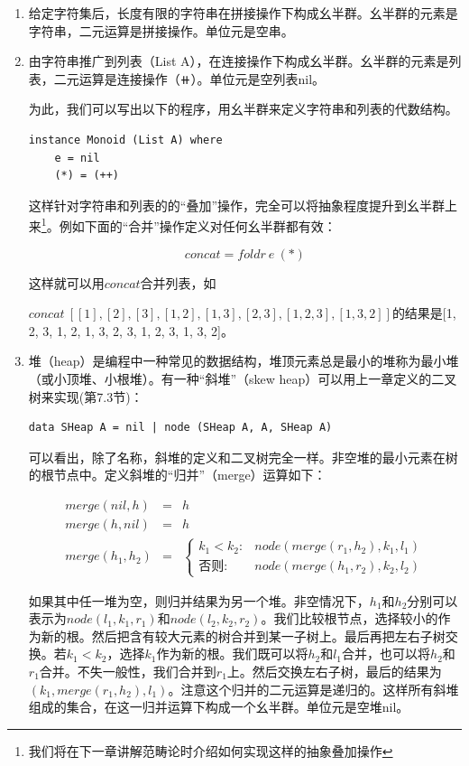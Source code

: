 \documentclass{article}
\begin{document}
\begin{enumerate}
\item 给定字符集后，长度有限的字符串在拼接操作下构成幺半群。幺半群的元素是字符串，二元运算是拼接操作。单位元是空串。
\item 由字符串推广到列表（List A），在连接操作下构成幺半群。幺半群的元素是列表，二元运算是连接操作（$\doubleplus$）。单位元是空列表nil。

为此，我们可以写出以下的程序，用幺半群来定义字符串和列表的代数结构。

\begin{lstlisting}
instance Monoid (List A) where
    e = nil
    (*) = (++)
\end{lstlisting}

这样针对字符串和列表的的“叠加”操作，完全可以将抽象程度提升到幺半群上来\footnote{我们将在下一章讲解范畴论时介绍如何实现这样的抽象叠加操作}。例如下面的“合并”操作定义对任何幺半群都有效：

\[
concat = foldr\ e\ (*)
\]

这样就可以用$concat$合并列表，如

$concat\ [[1], [2], [3], [1, 2], [1, 3], [2, 3], [1, 2, 3], [1, 3, 2]]$的结果是[1, 2, 3, 1, 2, 1, 3, 2, 3, 1, 2, 3, 1, 3, 2]。

\item 堆（heap）是编程中一种常见的数据结构，堆顶元素总是最小的堆称为最小堆（或小顶堆、小根堆）。有一种“斜堆”（skew heap）可以用上一章定义的二叉树来实现(\cite{LiuXinyu2017}第7.3节)：

\begin{lstlisting}
data SHeap A = nil | node (SHeap A, A, SHeap A)
\end{lstlisting}

可以看出，除了名称，斜堆的定义和二叉树完全一样。非空堆的最小元素在树的根节点中。定义斜堆的“归并”（merge）运算如下：

\[
\begin{array}{rcl}
merge(nil, h) & = & h \\
merge(h, nil) & = & h \\
merge(h_1, h_2) & = &
  \begin{cases}
  k_1 < k_2 : & node(merge(r_1, h_2), k_1, l_1) \\
  \text{否则}: & node(merge(h_1, r_2), k_2, l_2)
  \end{cases}
\end{array}
\]

如果其中任一堆为空，则归并结果为另一个堆。非空情况下，$h_1$和$h_2$分别可以表示为$node(l_1, k_1, r_1)$和$node(l_2, k_2, r_2)$。我们比较根节点，选择较小的作为新的根。然后把含有较大元素的树合并到某一子树上。最后再把左右子树交换。若$k_1 < k_2$，选择$k_1$作为新的根。我们既可以将$h_2$和$l_1$合并，也可以将$h_2$和$r_1$合并。不失一般性，我们合并到$r_1$上。然后交换左右子树，最后的结果为$(k_1, merge(r_1, h_2), l_1)$。注意这个归并的二元运算是递归的。这样所有斜堆组成的集合，在这一归并运算下构成一个幺半群。单位元是空堆nil。


\end{enumerate}
\end{document}
